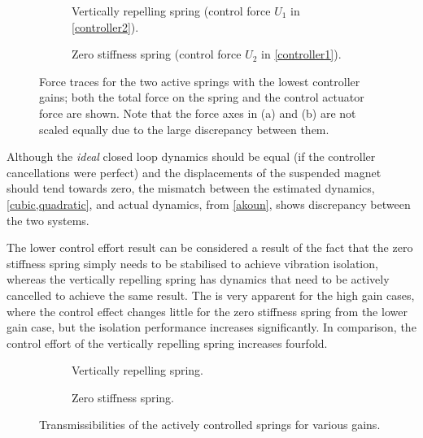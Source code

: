 \begin{figure}
\begin{wide}
  \begin{subfigure}
    \caption{Vertically repelling spring (control
     force $U_1$ in \eqref{controller2}).}
  \end{subfigure}
  \hfill
  \begin{subfigure}
    \caption{Zero stiffness spring (control force
     $U_2$ in \eqref{controller1}).}
  \end{subfigure}
  \end{wide}
  \caption{Force traces for the two active springs with the lowest
    controller gains; both the total force on the spring and the
    control actuator force are shown.  Note that the force axes in (a)
    and (b) are not scaled equally due to the large discrepancy
    between them.}
\end{figure}

Although the \emph{ideal} closed loop dynamics should be equal (if
the controller cancellations were perfect) and the displacements of
the suspended magnet should tend towards zero, the mismatch between
the estimated dynamics, \eqref{cubic,quadratic}, and actual
dynamics, from \eqref{akoun}, shows discrepancy between the two
systems.

The lower control effort result can be considered a result of the
fact that the zero stiffness spring simply needs to be stabilised to
achieve vibration isolation, whereas the vertically repelling spring
has dynamics that need to be actively cancelled to achieve the same
result. The is very apparent for the high gain cases, where the
control effect changes little for the zero stiffness spring from the
lower gain case, but the isolation performance increases
significantly. In comparison, the control effort of the vertically
repelling spring increases fourfold.

\begin{figure}
  \begin{wide}
    \begin{subfigure}
      \caption{Vertically repelling spring.}
    \end{subfigure}
    \hfill
    \begin{subfigure}
      \caption{Zero stiffness spring.}
    \end{subfigure}
  \end{wide}
  \caption{Transmissibilities of the actively controlled springs for various gains.}
\end{figure}

